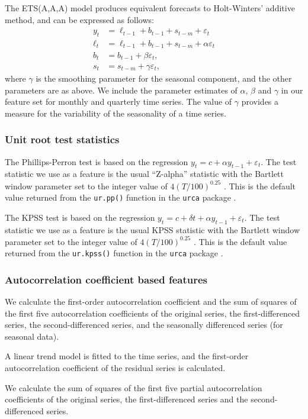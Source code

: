 \documentclass[11pt,a4paper,]{article}
\begin{document}
The ETS(A,A,A) model \autocite{expsmooth08} produces equivalent forecasts to Holt-Winters' additive method, and can be expressed as follows:
\begin{align*}
  y_t    & = \ell_{t-1}+b_{t-1}+s_{t-m}+\varepsilon_t\\
  \ell_t & = \ell_{t-1}+b_{t-1}+s_{t-m}+\alpha \varepsilon_t\\
  b_t    & = b_{t-1}+\beta \varepsilon_t,\\
  s_t &= s_{t-m} + \gamma\varepsilon_t,
\end{align*}
where \(\gamma\) is the smoothing parameter for the seasonal component, and the other parameters are as above. We include the parameter estimates of \(\alpha\), \(\beta\) and \(\gamma\) in our feature set for monthly and quarterly time series. The value of \(\gamma\) provides a measure for the variability of the seasonality of a time series.

\hypertarget{unit-root-test-statistics}{%
\subsubsection*{Unit root test statistics}\label{unit-root-test-statistics}}

The Phillips-Perron test is based on the regression \(y_t= c + \alpha y_{t-1}+ \varepsilon_t\). The test statistic we use as a feature is the usual ``Z-alpha'' statistic with the Bartlett window parameter set to the integer value of \(4(T/100)^{0.25}\) \autocite{Pfaff2008}. This is the default value returned from the \texttt{ur.pp()} function in the \texttt{urca} package \autocite{pfaff2016package}.

The KPSS test is based on the regression \(y_t=c+\delta t+\alpha y_{t-1}+\varepsilon_t\). The test statistic we use as a feature is the usual KPSS statistic with the Bartlett window parameter set to the integer value of \(4(T/100)^{0.25}\) \autocite{Pfaff2008}. This is the default value returned from the \texttt{ur.kpss()} function in the \texttt{urca} package \autocite{pfaff2016package}.

\hypertarget{autocorrelation-coefficient-based-features}{%
\subsubsection*{Autocorrelation coefficient based features}\label{autocorrelation-coefficient-based-features}}

We calculate the first-order autocorrelation coefficient and the sum of squares of the first five autocorrelation coefficients of the original series, the first-differenced series, the second-differenced series, and the seasonally differenced series (for seasonal data).

A linear trend model is fitted to the time series, and the first-order autocorrelation coefficient of the residual series is calculated.

We calculate the sum of squares of the first five partial autocorrelation coefficients of the original series, the first-differenced series and the second-differenced series.

\printbibliography
\end{document}
